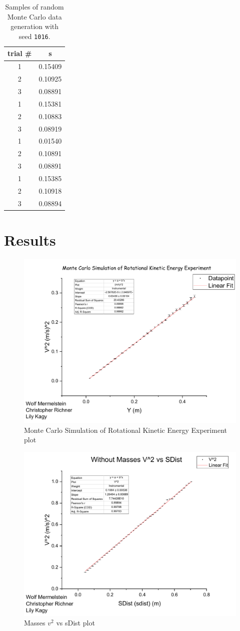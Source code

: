 \documentclass[coverpage]{article}
\begin{document}
	\begin{table}[h]
		\centering
		\caption{Samples of random Monte Carlo data generation with seed \texttt{1016}.}
		\begin{tabular}{c|c}
			trial \# & s \\ \hline
			1 & 0.15409 \\
			2 & 0.10925 \\
			3 & 0.08891 \\ \hline
			1 & 0.15381 \\
			2 & 0.10883 \\
			3 & 0.08919 \\ \hline
			1 & 0.01540 \\
			2 & 0.10891 \\
			3 & 0.08891 \\ \hline
			1 & 0.15385 \\
			2 & 0.10918 \\
			3 & 0.08894 \\
		\end{tabular}
	\end{table}
	
	\section{Results}
	
	\begin{figure}[h]
		\centering
		\caption{Monte Carlo Simulation of Rotational Kinetic Energy Experiment plot}
		\label{fig:monte-carlo-simulation}
		\includegraphics[width=.5\textwidth]{plots/monteCarloPlot.pdf}
	\end{figure}
	
	\begin{figure}[h]
		\centering
		\caption{Masses $v^2$ vs sDist plot}
		\label{fig:plot-without-masses}
		\includegraphics[width=.5\textwidth]{plots/withMassesPlot.pdf}
	\end{figure}
	
\end{document}
